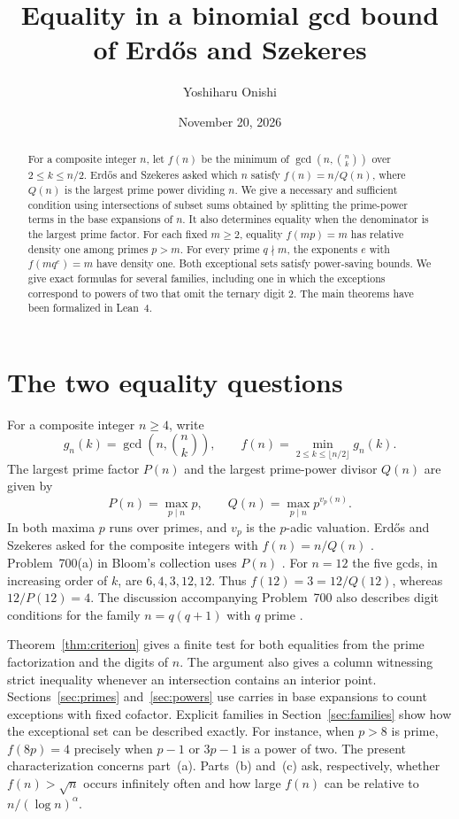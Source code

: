 \documentclass[a4paper,11pt]{article}
\title{\bfseries Equality in a binomial gcd bound\\of Erd\H{o}s and Szekeres}
\author{Yoshiharu Onishi}
\date{November 20, 2026}
\newcommand{\colg}[2]{g_{#1}(#2)}
\begin{document}
\maketitle

\begin{abstract}
For a composite integer \(n\), let \(f(n)\) be the minimum of
\(\gcd(n,\binom nk)\) over \(2\le k\le n/2\). Erd\H{o}s and Szekeres asked
which \(n\) satisfy \(f(n)=n/Q(n)\), where \(Q(n)\) is the largest prime
power dividing \(n\). We give a necessary and sufficient condition using
intersections of subset sums obtained by splitting the prime-power terms in
the base expansions of \(n\). It also determines equality when the
denominator is the largest prime factor. For each fixed \(m\ge2\), equality
\(f(mp)=m\) has relative density one among primes \(p>m\). For every prime
\(q\nmid m\), the exponents \(e\) with \(f(mq^e)=m\) have density one.
Both exceptional sets satisfy power-saving bounds. We give exact formulas
for several families, including one in which the exceptions correspond to
powers of two that omit the ternary digit \(2\). The main theorems have
been formalized in Lean~4.
\end{abstract}

\section{The two equality questions}\label{sec:intro}

For a composite integer \(n\ge4\), write
\begin{equation}\label{eq:definition}
  \colg nk=\gcd\!\left(n,\binom nk\right),\qquad
  f(n)=\min_{2\le k\le\lfloor n/2\rfloor}\colg nk .
\end{equation}
The largest prime factor \(P(n)\) and the largest prime-power divisor
\(Q(n)\) are given by
\[
  P(n)=\max_{p\mid n}p,\qquad Q(n)=\max_{p\mid n}p^{v_p(n)}.
\]
In both maxima \(p\) runs over primes, and \(v_p\) is the \(p\)-adic
valuation. Erd\H{o}s and Szekeres asked for the composite integers with
\(f(n)=n/Q(n)\) \cite[pp.~98--99]{ES}. Problem~700(a) in Bloom's collection
uses \(P(n)\) \cite{Bloom}. For \(n=12\) the five gcds, in increasing order
of \(k\), are \(6,4,3,12,12\). Thus \(f(12)=3=12/Q(12)\), whereas
\(12/P(12)=4\). The discussion accompanying Problem~700 also describes
digit conditions for the family \(n=q(q+1)\) with \(q\) prime \cite{Bloom}.

Theorem~\ref{thm:criterion} gives a finite test for both equalities from
the prime factorization and the digits of \(n\). The argument also gives a
column witnessing strict inequality whenever an intersection contains an
interior point. Sections~\ref{sec:primes} and~\ref{sec:powers} use carries in
base expansions to count exceptions with fixed cofactor. Explicit
families in Section~\ref{sec:families} show how the exceptional set can
be described exactly. For instance, when \(p>8\) is prime, \(f(8p)=4\)
precisely when \(p-1\) or \(3p-1\) is a power of two. The present
characterization concerns part~(a). Parts~(b) and~(c) ask, respectively,
whether \(f(n)>\sqrt n\) occurs infinitely often and how large \(f(n)\)
can be relative to \(n/(\log n)^\alpha\).
\end{document}
